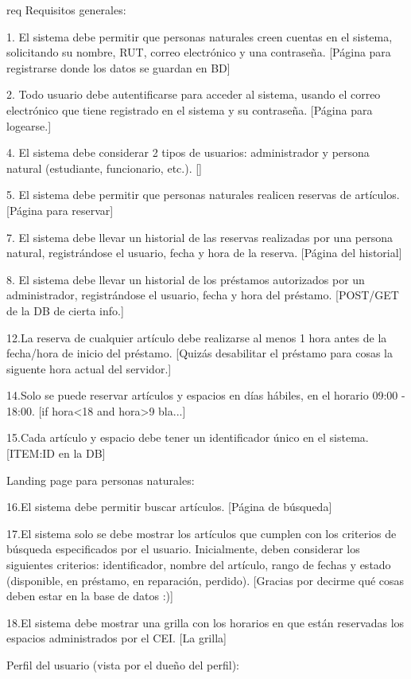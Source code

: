 req
Requisitos generales:
	
	1. El sistema debe permitir que personas naturales creen cuentas en el sistema, solicitando su nombre, RUT, correo electrónico y una contraseña.
		[Página para registrarse donde los datos se guardan en BD]

	2. Todo usuario debe autentificarse para acceder al sistema, usando el correo electrónico que tiene registrado en el sistema y su contraseña.
		[Página para logearse.]

	4. El sistema debe considerar 2 tipos de usuarios: administrador y persona natural (estudiante, funcionario, etc.).
		[]

	5. El sistema debe permitir que personas naturales realicen reservas de artículos.
		[Página para reservar]

	7. El sistema debe llevar un historial de las reservas realizadas por una persona natural, registrándose el usuario, fecha y hora de la reserva.
		[Página del historial]

	8. El sistema debe llevar un historial de los préstamos autorizados por un
	administrador, registrándose el usuario, fecha y hora del préstamo.
		[POST/GET de la DB de cierta info.]

	12.La reserva de cualquier artículo debe realizarse al menos 1 hora antes de la fecha/hora de inicio del préstamo.
		[Quizás desabilitar el préstamo para cosas la siguente hora actual del servidor.]

	14.Solo se puede reservar artículos y espacios en días hábiles, en el horario 09:00 - 18:00.
		[if hora<18 and hora>9 bla...]
	
	15.Cada artículo y espacio debe tener un identificador único en el sistema.
		[ITEM:ID en la DB]

Landing page para personas naturales:
	
	16.El sistema debe permitir buscar artículos.
		[Página de búsqueda]
	
	17.El sistema solo se debe mostrar los artículos que cumplen con los criterios de búsqueda especificados por el usuario. Inicialmente, deben considerar los siguientes criterios: identificador, nombre del artículo, rango de fechas y estado (disponible, en préstamo, en reparación, perdido).
		[Gracias por decirme qué cosas deben estar en la base de datos :)]

	18.El sistema debe mostrar una grilla con los horarios en que están reservadas los espacios administrados por el CEI.
		[La grilla]

Perfil del usuario (vista por el dueño del perfil):


